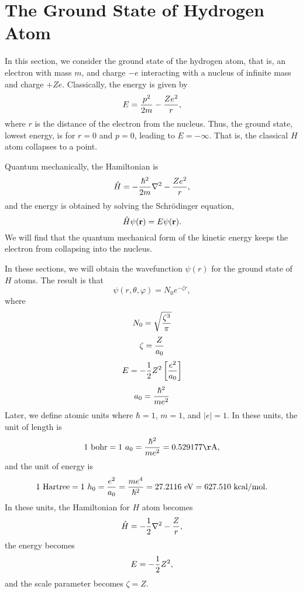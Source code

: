 \section{The Ground State of Hydrogen Atom}

In this section, we consider the ground state of the hydrogen atom, that 
is, an electron with mass $m$, and charge $-e$ interacting with a nucleus
of infinite mass and charge $+Ze$.  Classically, the energy is given by
\begin{equation}
E = {p^2 \over 2m} - {Ze^2 \over r} ,
\end{equation}
where $r$ is the distance of the electron from the nucleus. Thus, the 
ground state, lowest energy, is for $r = 0$ and $p = 0$, leading to $E = 
-\infty$. That is, the classical $H$ atom collapses to a point.

Quantum mechanically, the Hamiltonian is
\begin{equation}
{\hat H} = - {\hbar^2 \over 2m} \nabla^2 - {Ze^2 \over r},
\end{equation}
and the energy is obtained by solving the Schr\"odinger equation,
\begin{equation}
{\hat H} \psi ( {\bf r} ) = E \psi ( {\bf r} ).
\end{equation}
We will find that the quantum mechanical form of the kinetic energy 
keeps the electron from collapsing into the nucleus.

In these sections, we will obtain the wavefunction $\psi (r)$ for 
the ground state of $H$ atoms. The result is that
\begin{equation}
\psi ( r, \theta, \varphi ) = N_0 e^{- \zeta r} ,
\end{equation}
where 
\begin{equation}
N_0 = \sqrt{{\zeta^3 \over \pi}}
\end{equation}
\begin{equation}
\zeta = {Z \over a_0}
\end{equation}
\begin{equation}
E = - {1 \over 2} Z^2 \left[ {e^2 \over a_0} \right]
\end{equation}
\begin{equation}
a_0 = {\hbar^2 \over me^2}
\end{equation}
Later, we define atomic units where $\hbar = 1$, $m = 1$, and $|e| = 1$.  
In these units, the unit of length is
\begin{equation}
1\ \mathrm{bohr} = 1\ a_0 = {\hbar^2 \over me^2} 
  = 0.529177 \mathrm{\AA},
\end{equation}
and the unit of energy is
\begin{equation}
1\ \mathrm{Hartree} = 1\ h_0 = {e^2 \over a_0} = {me^4 \over \hbar^2}
= 27.2116\ \mathrm{eV}  
= 627.510\ \mathrm{kcal/mol}.
\end{equation}
In these units, the Hamiltonian for $H$ atom becomes
\begin{equation}
{\hat H} = - {1 \over 2} \nabla^2 - {Z \over r},
\end{equation}
the energy becomes
\begin{equation}
E = - {1 \over 2} Z^2,
\end{equation}
and the scale parameter becomes $\zeta = Z$.

